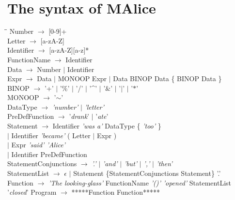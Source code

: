 \documentclass[a4wide, 11pt]{article}
\begin{document}
\section{The syntax of MAlice}
\label{sec:bnf}
	\begin{tabbing}
	\hspace*{8mm}\=\hspace*{25mm}\=\kill
		\> Number $\rightarrow$ [0-9]+ \\
		\> Letter $\rightarrow$ [a-zA-Z] \\
		\> Identifier $\rightarrow$ [a-zA-Z][a-z]* \\
		\> FunctionName $\rightarrow$ Identifier \\
		\> Data $\rightarrow$ Number $\mid$ Identifier \\
		\> Expr	$\rightarrow$ Data $\mid$ MONOOP Expr 
					$\mid$ Data BINOP Data \{ BINOP Data \}\\
		\> BINOP $\rightarrow$ '+' $\mid$ '$\%$' $\mid$ '/' $\mid$ '\^{ }' 
							$\mid$ '$\&$' $\mid$ '$\mid$' $\mid$ '$\ast$' \\
		\> MONOOP $\rightarrow$ '$\mathtt{\sim}$'\\

		\> DataType $\rightarrow$ \emph{'number'} $\mid$ \emph{'letter'} \\
		\> PreDefFunction $\rightarrow$ '\emph{drank}' $\mid$ '\emph{ate}' \\

		
		\> Statement $\rightarrow$ Identifier \emph{'was a'} DataType \{ \emph{'too'} \}\\
		\> \> $\mid$ Identifier \emph{'became'} ( Letter $\mid$ Expr ) \\
		\> \>	$\mid$ Expr \emph{'said' 'Alice'} \\
		\> \> $\mid$ Identifier PreDefFunction \\

				
		\> StatementConjunctions $\rightarrow$ \emph{'.'} $\mid$ \emph{'and'} $\mid$ \emph{'but'} $\mid$ \emph{','} $\mid$ \emph{'then'} \\
		\> StatementList $\rightarrow$ $\epsilon$ $\mid$ Statement \{StatementConjunctions Statement\} '.' \\

		\> Function $\rightarrow$ \emph{'The looking-glass'} FunctionName  \emph{'()' 'opened' } StatementList '\emph{closed}'
		\> Program $\rightarrow$ *****Function {Function}*****
	\end{tabbing}
	

\begin{verbatim}
\end{verbatim}
\end{document}
